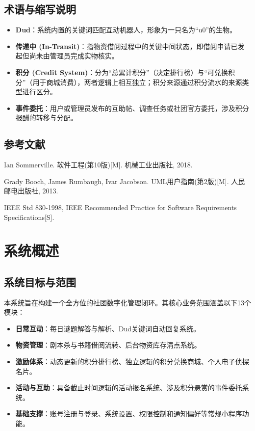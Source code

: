\documentclass[a4paper,12pt]{article}
\begin{document}
\subsection{术语与缩写说明}
\begin{itemize}[label=---]
    \item \textbf{Dud}：系统内置的关键词匹配互动机器人，形象为一只名为“u0”的生物。
    \item \textbf{传递中 (In-Transit)}：指物资借阅过程中的关键中间状态，即借阅申请已发起但尚未由管理员完成实物核实。
    \item \textbf{积分 (Credit System)}：分为“总累计积分”（决定排行榜）与“可兑换积分”（用于商城消费），两者逻辑上相互独立；积分来源通过积分流水的来源类型进行区分。
    \item \textbf{事件委托}：用户或管理员发布的互助帖、调查任务或社团官方委托，涉及积分报酬的转移与分配。
\end{itemize}

\subsection{参考文献}
\begin{enumerate}[label={[\arabic*]}]
    \item Ian Sommerville. 软件工程(第10版)[M]. 机械工业出版社, 2018.
    \item Grady Booch, James Rumbaugh, Ivar Jacobson. UML用户指南(第2版)[M]. 人民邮电出版社, 2013.
    \item IEEE Std 830-1998, IEEE Recommended Practice for Software Requirements Specifications[S].
\end{enumerate}

\section{系统概述}

\subsection{系统目标与范围}
本系统旨在构建一个全方位的社团数字化管理闭环。其核心业务范围涵盖以下13个模块：
\begin{itemize}
    \item \textbf{日常互动}：每日谜题解答与解析、Dud关键词自动回复系统。
    \item \textbf{物资管理}：剧本杀与书籍借阅流转、后台物资库存清点系统。
    \item \textbf{激励体系}：动态更新的积分排行榜、独立逻辑的积分兑换商城、个人电子侦探名片。
    \item \textbf{活动与互助}：具备截止时间逻辑的活动报名系统、涉及积分悬赏的事件委托系统。
    \item \textbf{基础支撑}：账号注册与登录、系统设置、权限控制和通知偏好等常规小程序功能。
\end{itemize}
\end{document}
